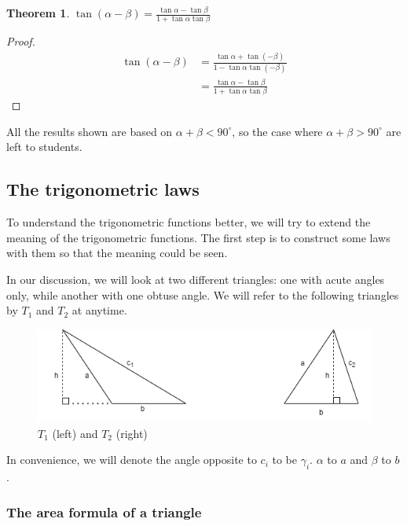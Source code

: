 \documentclass[12pt]{article}
\newtheorem*{theorem}{Theorem}
\begin{document}
    \begin{theorem}
        $\tan(\alpha-\beta)=\frac{\tan{\alpha}-\tan{\beta}}{1+\tan{\alpha}\tan{\beta}}$
    \end{theorem}

    \begin{proof}
        \begin{align*}
            \tan(\alpha-\beta)&=\frac{\tan{\alpha}+\tan(-\beta)}{1-\tan{\alpha}\tan(-\beta)}\\
            &=\frac{\tan{\alpha}-\tan{\beta}}{1+\tan{\alpha}\tan{\beta}}
        \end{align*}
    \end{proof}

    All the results shown are based on $\alpha+\beta<90^\circ$, so the case where $\alpha+\beta>90^\circ$ are left to students.

    \subsection{The trigonometric laws}

    To understand the trigonometric functions better, we will try to extend the meaning of the trigonometric functions. The first step is to construct some laws with them so that the meaning could be seen.

    In our discussion, we will look at two different triangles: one with acute angles only, while another with one obtuse angle. We will refer to the following triangles by $T_1$ and $T_2$ at anytime.

    \begin{figure}[H]
        \centering
        \includegraphics[scale=0.8]{triangles.png}
        \caption{$T_1$ (left) and $T_2$ (right)}
    \end{figure}

    In convenience, we will denote the angle opposite to $c_i$ to be $\gamma_i$. $\alpha$ to $a$ and $\beta$ to $b$.

    \subsubsection*{The area formula of a triangle}
\end{document}
